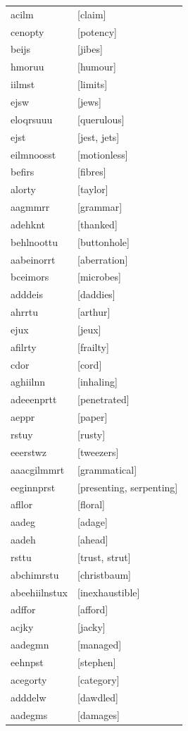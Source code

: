 \documentclass{article}
\begin{document}
\begin{tabular}{ll}
acilm & [claim] \\
cenopty & [potency] \\
beijs & [jibes] \\
hmoruu & [humour] \\
iilmst & [limits] \\
ejsw & [jews] \\
eloqrsuuu & [querulous] \\
ejst & [jest, jets] \\
eilmnoosst & [motionless] \\
befirs & [fibres] \\
alorty & [taylor] \\
aagmmrr & [grammar] \\
adehknt & [thanked] \\
behlnoottu & [buttonhole] \\
aabeinorrt & [aberration] \\
bceimors & [microbes] \\
adddeis & [daddies] \\
ahrrtu & [arthur] \\
ejux & [jeux] \\
afilrty & [frailty] \\
cdor & [cord] \\
aghiilnn & [inhaling] \\
adeeenprtt & [penetrated] \\
aeppr & [paper] \\
rstuy & [rusty] \\
eeerstwz & [tweezers] \\
aaacgilmmrt & [grammatical] \\
eeginnprst & [presenting, serpenting] \\
afllor & [floral] \\
aadeg & [adage] \\
aadeh & [ahead] \\
rsttu & [trust, strut] \\
abchimrstu & [christbaum] \\
abeehiilnstux & [inexhaustible] \\
adffor & [afford] \\
acjky & [jacky] \\
aadegmn & [managed] \\
eehnpst & [stephen] \\
acegorty & [category] \\
adddelw & [dawdled] \\
aadegms & [damages] \\

\end{tabular}
\end{document}
